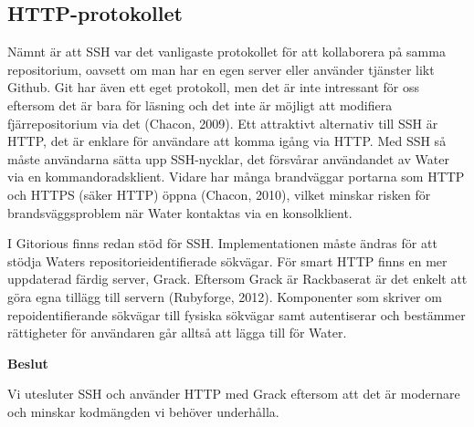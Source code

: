 \subsection{HTTP-protokollet}
Nämnt är att SSH var det vanligaste protokollet för att kollaborera på samma
repositorium, oavsett om man har en egen server eller använder tjänster likt
Github. Git har även ett eget protokoll, men det är inte intressant för oss
eftersom det är bara för läsning och det inte är möjligt att modifiera
fjärrepositorium via det (Chacon, 2009). Ett attraktivt alternativ till SSH är
HTTP, det är enklare för användare att komma igång via HTTP.  Med SSH så måste
användarna sätta upp SSH-nycklar, det försvårar användandet av Water via en
kommandoradsklient.  Vidare har många brandväggar portarna som HTTP och HTTPS
(säker HTTP) öppna (Chacon, 2010), vilket minskar risken för brandsväggsproblem
när Water kontaktas via en konsolklient.

I Gitorious finns redan stöd för SSH. Implementationen måste ändras för att
stödja Waters repositorieidentifierade sökvägar. För smart HTTP finns en mer
uppdaterad färdig server, Grack.  Eftersom Grack är Rackbaserat är det enkelt
att göra egna tillägg till servern (Rubyforge, 2012). Komponenter som skriver
om repoidentifierande sökvägar till fysiska sökvägar samt autentiserar och
bestämmer rättigheter för användaren går alltså att lägga till för Water.

\begin{flushright}
  
  \textbf{Beslut}
  
  Vi utesluter SSH och använder HTTP med Grack eftersom att det är modernare och minskar kodmängden vi behöver underhålla.
  
\end{flushright}
